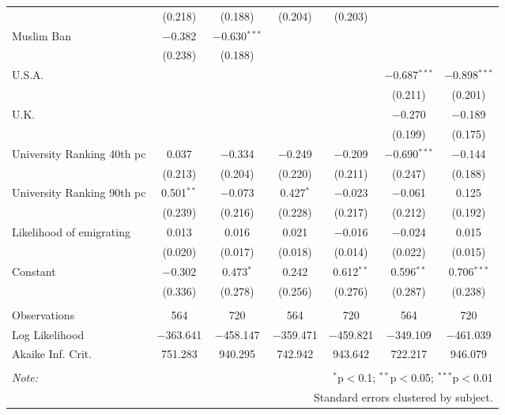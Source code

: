 \begin{sidewaystable}[!htbp]
\begin{tabular}{@{\extracolsep{5pt}}lcccccc}
  & (0.218) & (0.188) & (0.204) & (0.203) &  &  \\ 
  Muslim Ban & $-$0.382 & $-$0.630$^{***}$ &  &  &  &  \\ 
  & (0.238) & (0.188) &  &  &  &  \\ 
  U.S.A. &  &  &  &  & $-$0.687$^{***}$ & $-$0.898$^{***}$ \\ 
  &  &  &  &  & (0.211) & (0.201) \\ 
  U.K. &  &  &  &  & $-$0.270 & $-$0.189 \\ 
  &  &  &  &  & (0.199) & (0.175) \\ 
  University Ranking 40th pc & 0.037 & $-$0.334 & $-$0.249 & $-$0.209 & $-$0.690$^{***}$ & $-$0.144 \\ 
  & (0.213) & (0.204) & (0.220) & (0.211) & (0.247) & (0.188) \\ 
  University Ranking 90th pc & 0.501$^{**}$ & $-$0.073 & 0.427$^{*}$ & $-$0.023 & $-$0.061 & 0.125 \\ 
  & (0.239) & (0.216) & (0.228) & (0.217) & (0.212) & (0.192) \\ 
  Likelihood of emigrating & 0.013 & 0.016 & 0.021 & $-$0.016 & $-$0.024 & 0.015 \\ 
  & (0.020) & (0.017) & (0.018) & (0.014) & (0.022) & (0.015) \\ 
  Constant & $-$0.302 & 0.473$^{*}$ & 0.242 & 0.612$^{**}$ & 0.596$^{**}$ & 0.706$^{***}$ \\ 
  & (0.336) & (0.278) & (0.256) & (0.276) & (0.287) & (0.238) \\ 
 \hline \\[-1.8ex] 
Observations & 564 & 720 & 564 & 720 & 564 & 720 \\ 
Log Likelihood & $-$363.641 & $-$458.147 & $-$359.471 & $-$459.821 & $-$349.109 & $-$461.039 \\ 
Akaike Inf. Crit. & 751.283 & 940.295 & 742.942 & 943.642 & 722.217 & 946.079 \\ 
\hline 
\hline \\[-1.8ex] 
\textit{Note:}  & \multicolumn{6}{r}{$^{*}$p$<$0.1; $^{**}$p$<$0.05; $^{***}$p$<$0.01} \\ 
 & \multicolumn{6}{r}{Standard errors clustered by subject.} \\ 
\end{tabular} 
\end{sidewaystable} 
